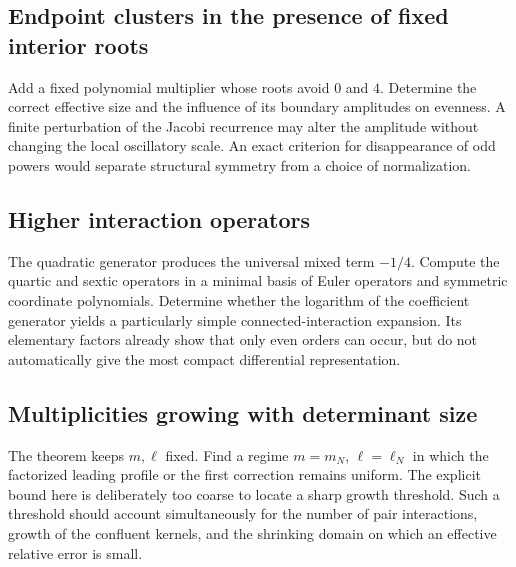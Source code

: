 \documentclass[11pt,a4paper]{article}
\numberwithin{equation}{section}
\theoremstyle{definition}
\theoremstyle{remark}
\begin{document}
\subsection{Endpoint clusters in the presence of fixed interior roots}\label{ic:x:tecq2}
Add a fixed polynomial multiplier whose roots avoid $0$ and $4$.
Determine the correct effective size and the influence of its boundary
amplitudes on evenness. A finite perturbation of the Jacobi recurrence
may alter the amplitude without changing the local oscillatory scale.
An exact criterion for disappearance of odd powers would separate
structural symmetry from a choice of normalization.

\subsection{Higher interaction operators}
The quadratic generator produces the universal mixed term $-1/4$.
Compute the quartic and sextic operators in a minimal basis of Euler
operators and symmetric coordinate polynomials. Determine whether the
logarithm of the coefficient generator yields a particularly simple
connected-interaction expansion. Its elementary factors already show
that only even orders can occur, but do not automatically give the most
compact differential representation.

\subsection{Multiplicities growing with determinant size}\label{gs:x:tecq4}
The theorem keeps $m,\ell$ fixed. Find a regime $m=m_N$, $\ell=\ell_N$
in which the factorized leading profile or the first correction remains
uniform. The explicit bound here is deliberately too coarse to locate a
sharp growth threshold. Such a threshold should account simultaneously
for the number of pair interactions, growth of the confluent kernels,
and the shrinking domain on which an effective relative error is small.

\noindent[Added 29 September 2026, batch 57: partly answered by Part~VI,
for $\ell=0$ and the cluster $x^m(x+\varepsilon)$ with one outward
displacement $\varepsilon\ge0$: the ratio to $H_N(x^{m+1})$ tends to $1$
exactly when $\varepsilon N(N+m+1)/(4m+2)\to0$, for every growth of $m$
(Corollary~\ref{gs:cor:invisibility}).  For fixed $m$ this is the
threshold $N^2\varepsilon\to0$ of Theorem~\ref{tec:thm:scale}, and when
$N^2\varepsilon\to y$ the limit is ${}_0F_1(;m+\tfrac12;y/4)$
\eqref{gs:eq:fixed-m}; for $N,m\to\infty$ the fixed-$m$ profile is
replaced by $e^\tau$ with the corrections of
Theorem~\ref{gs:thm:hierarchy}, on the critical scales of
Theorem~\ref{gs:thm:overview}.  Several displaced roots, $\ell>0$, the
first correction in the sense of Theorem~\ref{tec:thm:main} and an
approximation uniform in $1\le m\le N$ (Section~\ref{gs:x:bridge})
remain open (Section~\ref{gs:sec:answers}).]
\end{document}
